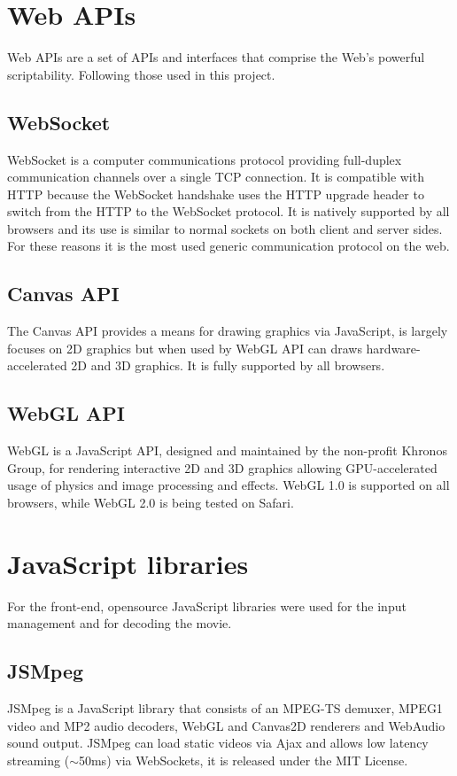 \section{Web APIs}
Web APIs are a set of APIs and interfaces that comprise the Web's powerful scriptability. Following those used in this project\cite{Web_APIs}.

\subsection{WebSocket}
WebSocket is a computer communications protocol providing full-duplex communication channels over a single TCP connection. It is compatible with HTTP because the WebSocket handshake uses the HTTP upgrade header to switch from the HTTP to the WebSocket protocol. It is natively supported by all browsers and its use is similar to normal sockets on both client and server sides. For these reasons it is the most used generic communication protocol on the web\cite{WebSocket_Web_APIs}.

\subsection{Canvas API}
The Canvas API provides a means for drawing graphics via JavaScript, is largely focuses on 2D graphics but when used by WebGL API can draws hardware-accelerated 2D and 3D graphics. It is fully supported by all browsers\cite{Canvas_API}.

\subsection{WebGL API}
WebGL is a JavaScript API, designed and maintained by the non-profit Khronos Group, for rendering interactive 2D and 3D graphics allowing GPU-accelerated usage of physics and image processing and effects. WebGL 1.0 is supported on all browsers, while WebGL 2.0 is being tested on Safari\cite{WebGL}.



\section{JavaScript libraries}
For the front-end, opensource JavaScript libraries were used for the input management and for decoding the movie.

\subsection{JSMpeg}
JSMpeg is a JavaScript library that consists of an MPEG-TS demuxer, MPEG1 video and MP2 audio decoders, WebGL and Canvas2D renderers and WebAudio sound output. JSMpeg can load static videos via Ajax and allows low latency streaming ($\sim$50ms) via WebSockets, it is released under the MIT License\cite{JSMpeg}.

